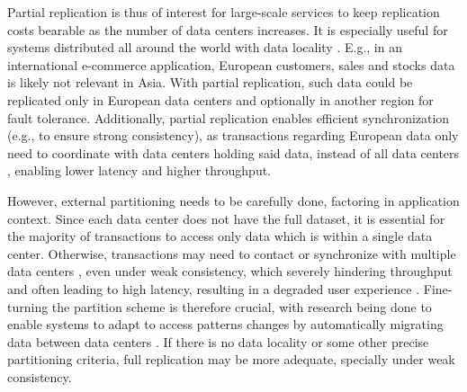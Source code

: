 Partial replication is thus of interest for large-scale services to keep replication costs bearable as the number of data centers increases.
It is especially useful for systems distributed all around the world with data locality \cite{sipre, slog, detock, caerus}.
E.g., in an international e-commerce application, %
European customers, sales and stocks data is likely not relevant in Asia.
With partial replication, such data could be replicated only in European data centers and optionally in another region for fault tolerance.
Additionally, partial replication enables efficient synchronization (e.g., to ensure strong consistency), as transactions regarding European data only need to coordinate with data centers holding said data, instead of all data centers
\cite{spanner, sipre, slog, caerus, sconekv}, enabling lower latency and higher throughput.

However, external partitioning needs to be carefully done, factoring in  application context.
Since each data center does not have the full dataset, 
it is essential for the majority of transactions to access only data which is within a single data center.
Otherwise, transactions may need to contact or synchronize with multiple data centers \cite{spanner, sipre, chronocache, slog}, even under weak consistency, which severely hindering throughput and often leading to high latency, resulting in a degraded user experience \cite{eiger, mdcc, LatencyIncrease}.
Fine-turning the partition scheme is therefore crucial, with research being done to enable systems to adapt to access patterns changes by automatically migrating data between data centers \cite{slog, detock, morphosys, asymmetric, sipre}.
If there is no data locality or some other precise partitioning criteria, full replication may be more adequate, specially under weak consistency.

